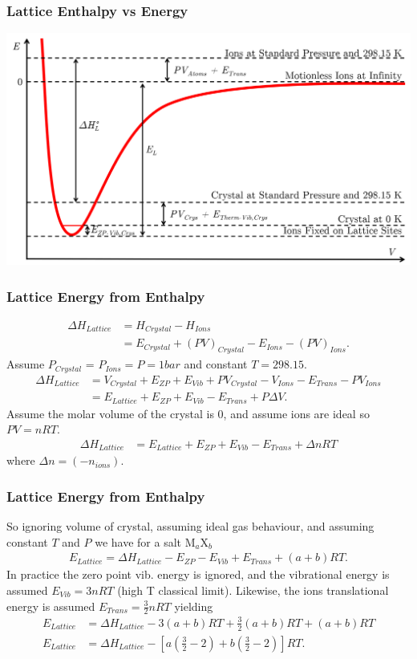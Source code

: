 \documentclass{beamer}
\newenvironment{noheadline}{
	\setbeamertemplate{headline}{}
	\addtobeamertemplate{frametitle}{\vspace*{-0.9\baselineskip}}{}
}{}
\begin{document}
\begin{noheadline}
\begin{frame}
\frametitle{Lattice Enthalpy vs Energy}
\begin{center}
	\includegraphics[trim={0cm 0cm 0cm 0cm},clip,width=\textwidth]{figures/Lattice_Energy.png}
\end{center}
\end{frame}

\begin{frame}
\frametitle{Lattice Energy from Enthalpy}
\begin{align*}
\Delta H_{Lattice} &=  H_{Crystal} - H_{Ions} \\
&= E_{Crystal} + (PV)_{Crystal} - E_{Ions} - (PV)_{Ions}.
\end{align*}
Assume $P_{Crystal}$ = $P_{Ions} = P = 1 bar$ and constant $T = 298.15$.
\begin{align*}
\Delta H_{Lattice} &= V_{Crystal} + E_{ZP} + E_{Vib} + PV_{Crystal} - V_{Ions} - E_{Trans} - PV_{Ions}\\
&= E_{Lattice} + E_{ZP} + E_{Vib} - E_{Trans} + P\Delta V .
\end{align*}
Assume the molar volume of the crystal is 0, and assume ions are ideal so $PV = nRT$.
\begin{align*}
\Delta H_{Lattice} &= E_{Lattice} + E_{ZP} + E_{Vib} - E_{Trans} + \Delta n RT 
\end{align*}
where $\Delta n = (- n_{ions})$.
\end{frame}

\begin{frame}
\frametitle{Lattice Energy from Enthalpy}
So ignoring volume of crystal, assuming ideal gas behaviour, and assuming constant $T$ and $P$ we have for a salt M$_{a}$X$_{b}$
\begin{align*}
E_{Lattice} = \Delta H_{Lattice} - E_{ZP} - E_{Vib} + E_{Trans} + (a + b) RT .
\end{align*}
In practice the zero point vib. energy is ignored, and the vibrational energy is assumed $E_{Vib} = 3 n R T$ (high T classical limit). Likewise, the ions translational energy is assumed $E_{Trans} = \frac{3}{2} n R T$ yielding
\begin{align*}
E_{Lattice} &= \Delta H_{Lattice} - 3 (a + b) R T + \frac{3}{2} (a + b) R T + (a + b) R T \\
E_{Lattice} &= \Delta H_{Lattice} - \left[ a \left( \frac { 3 } { 2 } - 2 \right) + b \left( \frac { 3 } { 2 } - 2 \right) \right] R T.
\end{align*}
\end{frame}


\end{noheadline}
\end{document}
